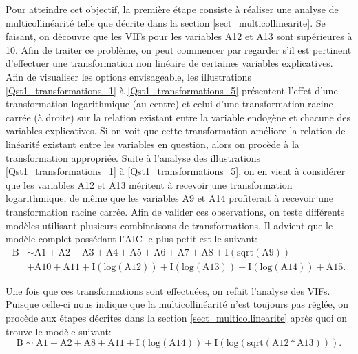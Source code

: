 \documentclass{article}
\begin{document}
	Pour atteindre cet objectif, la première étape consiste à réaliser une analyse de multicollinéarité telle que décrite dans la section \ref{sect_multicollinearite}. Se faisant, on découvre que les VIFs pour les variables A12 et A13 sont supérieures à 10. Afin de traiter ce problème, on peut commencer par regarder s'il est pertinent d'effectuer une transformation non linéaire de certaines variables explicatives. Afin de visualiser les options envisageable, les illustrations \ref{Qst1_transformations_1} à \ref{Qst1_transformations_5} présentent l'effet d'une transformation logarithmique (au centre) et celui d'une transformation racine carrée (à droite) sur la relation existant entre la variable endogène et chacune des variables explicatives. Si on voit que cette transformation améliore la relation de linéarité existant entre les variables en question, alors on procède à la transformation appropriée. Suite à l'analyse des illustrations \ref{Qst1_transformations_1} à \ref{Qst1_transformations_5}, on en vient à considérer que les variables A12 et A13 méritent à recevoir une transformation logarithmique, de même que les variables A9 et A14 profiterait à recevoir une transformation racine carrée. Afin de valider ces observations, on teste différents modèles utilisant plusieurs combinaisons de transformations. Il advient que le modèle complet possédant l'AIC le plus petit est le suivant:
	\begin{align}\label{modele_complet}
		\mathrm{B} &\sim \mathrm{A1 + A2 + A3 + A4 + A5 + A6 + A7 + A8 + I(sqrt(A9))}\\
			&\mathrm{+ A10 + A11 + I(log(A12)) + I(log(A13)) + I(log(A14)) + A15}.\nonumber
	\end{align}
	
	Une fois que ces transformations sont effectuées, on refait l'analyse des VIFs. Puisque celle-ci nous indique que la multicollinéarité n'est toujours pas réglée, on procède aux étapes décrites dans la section \ref{sect_multicollinearite} après quoi on trouve le modèle suivant:
	\begin{equation}\label{modele_traitement_multicol_methode_iterative}
		\mathrm{B} \sim \mathrm{A1 + A2 + A8 + A11 + I(log(A14)) + I(log(sqrt(A12 * A13)))}.
	\end{equation}
	
\end{document}
